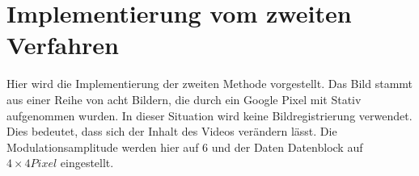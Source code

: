 



\section{Implementierung vom zweiten Verfahren}

Hier wird die Implementierung der zweiten Methode vorgestellt. Das Bild stammt aus einer Reihe von acht Bildern, die durch ein Google Pixel mit Stativ aufgenommen wurden. In dieser Situation wird keine Bildregistrierung verwendet. Dies bedeutet, dass sich der Inhalt des Videos verändern lässt. Die Modulationsamplitude werden hier auf 6 und der Daten Datenblock auf $ 4 \times 4 Pixel$ eingestellt. 

